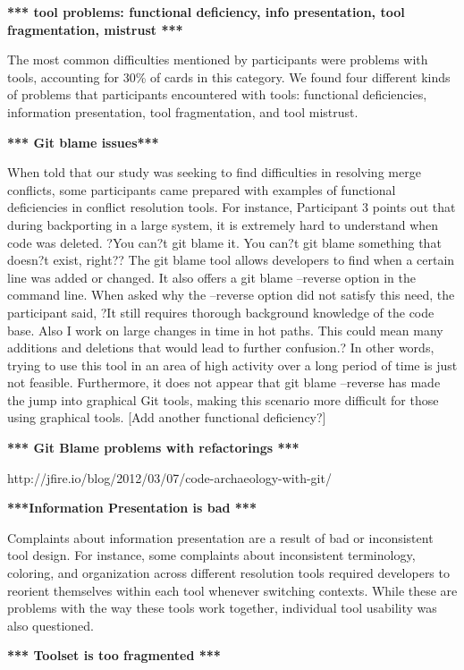 \documentclass[conference]{IEEEtran}
\begin{document}
\textbf{*** tool problems: functional deficiency, info presentation, tool fragmentation,  mistrust ***}

The most common difficulties mentioned by participants were problems with tools, accounting for 30\% of cards in this category. We found four different kinds of problems that participants encountered with tools: functional deficiencies, information presentation, tool fragmentation, and tool mistrust. 

\textbf{*** Git blame issues***}

When told that our study was seeking to find difficulties in resolving merge conflicts, some participants came prepared with examples of functional deficiencies in conflict resolution tools. For instance, Participant 3 points out that during backporting in a large system, it is extremely hard to understand when code was deleted. ?You can?t git blame it. You can?t git blame something that doesn?t exist, right?? 
The git blame tool allows developers to find when a certain line was added or changed. It also offers a git blame --reverse option in the command line. When asked why the --reverse option did not satisfy this need, the participant said, ?It still requires thorough background knowledge of the code base. Also I work on large changes in time in hot paths. This could mean many additions and deletions that would lead to further confusion.? In other words, trying to use this tool in an area of high activity over a long period of time is just not feasible. Furthermore, it does not appear that git blame --reverse has made the jump into graphical Git tools, making this scenario more difficult for those using graphical tools. [Add another functional deficiency?]

\textbf{*** Git Blame problems with refactorings ***}

http://jfire.io/blog/2012/03/07/code-archaeology-with-git/

\textbf{***Information Presentation is bad ***}

Complaints about information presentation are a result of bad or inconsistent tool design. For instance, some complaints about inconsistent terminology, coloring, and organization across different resolution tools required developers to reorient themselves within each tool whenever switching contexts. While these are problems with the way these tools work together, individual tool usability was also questioned.

\textbf{*** Toolset is too fragmented ***}
\end{document}
